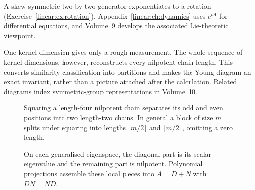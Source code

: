A skew-symmetric two-by-two generator exponentiates to a rotation (Exercise~\ref{linear:ex:rotation}). Appendix~\ref{linear:ch:dynamics} uses $e^{tA}$ for differential equations, and Volume~9 develops the associated Lie-theoretic viewpoint.

\begin{beauty}
One kernel dimension gives only a rough measurement. The whole sequence of kernel dimensions, however, reconstructs every nilpotent chain length. This converts similarity classification into partitions and makes the Young diagram an exact invariant, rather than a picture attached after the calculation. Related diagrams index symmetric-group representations in Volume~10.
\end{beauty}

\begin{figure}[ht]
\centering{}
\caption{Squaring a length-four nilpotent chain separates its odd and even positions into two length-two chains. In general a block of size $m$ splits under squaring into lengths $\lceil m/2\rceil$ and $\lfloor m/2\rfloor$, omitting a zero length.}
\label{fig:v8appCsquare}
\end{figure}
\begin{figure}[ht]
\centering{}
\caption{On each generalised eigenspace, the diagonal part is its scalar eigenvalue and the remaining part is nilpotent. Polynomial projections assemble these local pieces into $A=D+N$ with $DN=ND$.}
\label{fig:v8appCparts}
\end{figure}
